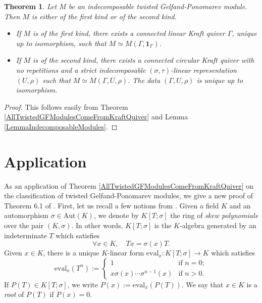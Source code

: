 \documentclass[12pt]{amsart}
\newtheorem{theorem}{Theorem}[section]
\theoremstyle{definition}
\newcommand{\<}{\langle}   %
\renewcommand{\>}{\rangle} %
\begin{document}
\begin{theorem}\label{TheoremClassificationIndecomposableGFModules}
    Let $M$ be an indecomposable twisted Gelfand-Ponomarev module. Then $M$ is either of the first kind or of the second kind. 
    \begin{itemize}
        \item If $M$ is of the first kind, there exists a connected linear Kraft quiver $\Gamma$, unique up to isomorphism, such that $M \simeq M(\Gamma,\mathbf 1_{\Gamma})$.
        \item If $M$ is of the second kind, there exists a connected circular Kraft quiver with no repetitions and a strict indecomposable $(\sigma,\tau)$-linear representation $(U,\rho)$ such that $M \simeq M(\Gamma,U,\rho)$. The data $(\Gamma,U,\rho)$ is unique up to isomorphism.
    \end{itemize}
\end{theorem}

\begin{proof}
    This follows easily from Theorem \ref{AllTwistedGFModulesComeFromKraftQuiver} and Lemma \ref{LemmaIndecomposableModules}.
\end{proof}

\section{Application} \label{Section5}

As an application of Theorem \ref{AllTwistedGFModulesComeFromKraftQuiver} on the classification of twisted Gelfand-Ponomarev modules, we give a new proof of Theorem 6.1 of \cite{kottwitzrapoport:2003}. First, let us recall a few notions from \cite{aryapoor:2024}. Given a field $K$ and an automorphism $\sigma \in \mathrm{Aut}(K)$, we denote by $K[T;\sigma]$ the ring of \textit{skew polynomials} over the pair $(K,\sigma)$. In other words, $K[T;\sigma]$ is the $K$-algebra generated by an indeterminate $T$ which satisfies 
\begin{equation*}
    \forall x \in K, \quad Tx = \sigma(x)T.
\end{equation*}
Given $x \in K$, there is a unique $K$-linear form $\mathrm{eval}_x:K[T;\sigma] \to K$ which satisfies 
\begin{equation*}
    \mathrm{eval}_x(T^n) := \begin{cases}
        1 & \text{if } n =0;\\
        x\sigma(x)\cdots \sigma^{n-1}(x) & \text{if } n>0.
    \end{cases}
\end{equation*}
If $P(T) \in K[T;\sigma]$, we write $P(x) := \mathrm{eval}_x(P(T))$. We say that $x \in K$ is a \textit{root} of $P(T)$ if $P(x) = 0$. 
\end{document}
